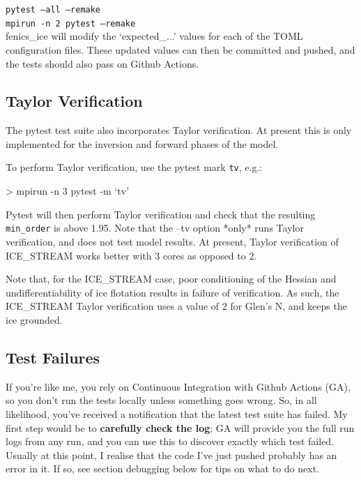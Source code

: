 \documentclass[11pt, reqno, nocenter]{article}
\begin{document}
\texttt{pytest --all --remake}\\
\texttt{mpirun -n 2 pytest --remake}\\

fenics\_ice will modify the `expected\_...' values for each of the TOML configuration files. These updated values can then be committed and pushed, and the tests should also pass on Github Actions.

\subsection{Taylor Verification}

The pytest test suite also incorporates Taylor verification. At present this is only implemented for the inversion and forward phases of the model.

To perform Taylor verification, use the pytest mark \texttt{tv}, e.g.:
\begin{spverbatim}
> mpirun -n 3 pytest -m `tv'
\end{spverbatim}

Pytest will then perform Taylor verification and check that the resulting \texttt{min\_order} is above 1.95. Note that the --tv option *only* runs Taylor verification, and does not test model results. At present, Taylor verification of ICE\_STREAM works better with 3 cores as opposed to 2.

Note that, for the ICE\_STREAM case, poor conditioning of the Hessian and undifferentiability of ice flotation results in failure of verification. As such, the ICE\_STREAM Taylor verification uses a value of 2 for Glen's N, and keeps the ice grounded.

\subsection{Test Failures}

If you're like me, you rely on Continuous Integration with Github Actions (GA), so you don't run the tests locally unless something goes wrong. So, in all likelihood, you've received a notification that the latest test suite has failed. My first step would be to \textbf{carefully check the log}; GA will provide you the full run logs from any run, and you can use this to discover exactly which test failed. Usually at this point, I realise that the code I've just pushed probably has an error in it. If so, see section debugging below for tips on what to do next.
\end{document}
